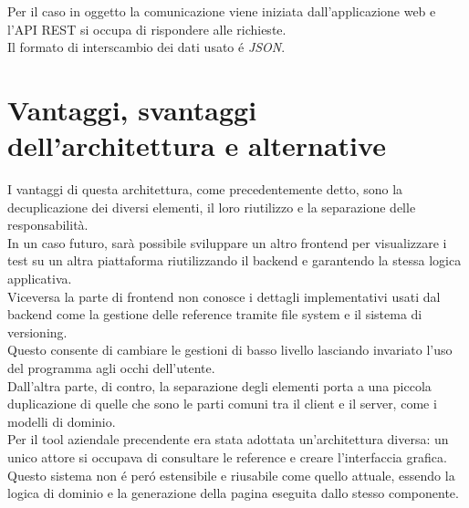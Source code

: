         Per il caso in oggetto la comunicazione viene iniziata dall'applicazione web e l'API REST si occupa di rispondere alle richieste.\\
        Il formato di interscambio dei dati usato \'e \textit{JSON}\cite{JSON}.

    \section{Vantaggi, svantaggi dell'architettura e alternative}
        I vantaggi di questa architettura, come precedentemente detto, sono la decuplicazione dei diversi elementi, il loro riutilizzo e la separazione delle responsabilità.\\
        
        In un caso futuro, sarà possibile sviluppare un altro frontend per visualizzare i test su un altra piattaforma riutilizzando il backend e garantendo la stessa logica applicativa.\\
        Viceversa la parte di frontend non conosce i dettagli implementativi usati dal backend come la gestione delle reference tramite file system e il sistema di versioning.\\
        Questo consente di cambiare le gestioni di basso livello lasciando invariato l'uso del programma agli occhi dell'utente.\\  
        
        Dall'altra parte, di contro, la separazione degli elementi porta a una piccola duplicazione di quelle che sono le parti comuni tra il client e il server, come i modelli di dominio.\\

        Per il tool aziendale precendente era stata adottata un'architettura diversa: un unico attore si occupava di consultare le reference e creare l'interfaccia grafica. \\
        Questo sistema non \'e per\'o estensibile e riusabile come quello attuale, essendo la logica di dominio e la generazione della pagina eseguita dallo stesso componente.
